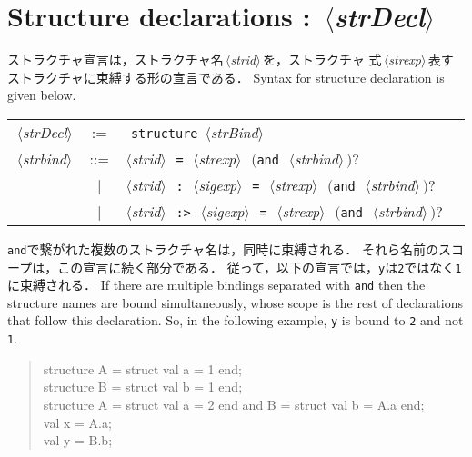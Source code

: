 \documentclass{jbook}
\newcommand{\txt}[2]{#2}
\newcommand{\code}[1]{\mbox{\large\tt #1}}
\newcommand{\vbar}{\mbox{\ $|$\ }}
\newcommand{\nonterm}[1]{\mbox{$\,\langle$}{\it #1}\mbox{$\rangle\,$}}
\newcommand{\term}[1]{\mbox{{\tt #1}}}
\newcommand{\optional}[1]{\mbox{$($}{\protect #1}\mbox{$)?$}}
\newenvironment{program}{\begin{quote}\begin{tt}}%
                        {\end{tt}\end{quote}}
\begin{document}
\section{
\txt{ストラクチャ宣言}{Structure declarations} : \nonterm{strDecl}
}

\ifjp%
	ストラクチャ宣言は，ストラクチャ名\nonterm{strid}を，ストラクチャ
式\nonterm{strexp}表すストラクチャに束縛する形の宣言である． 
\else%
	Syntax for structure declaration is given below.
\fi%

\begin{center}
\begin{tabular}{lcll}
\nonterm{strDecl} &:= &\ \term{structure} \nonterm{strBind}\\
\nonterm{strbind}
    &::=  & \nonterm{strid}\ \term{=}\ \nonterm{strexp}\ \optional{\term{and}\ \nonterm{strbind}}\\
    &\vbar& \nonterm{strid}\ \term{:}\ \nonterm{sigexp}\ \term{=}\ \nonterm{strexp}\ \optional{\term{and}\ \nonterm{strbind}}\\
    &\vbar& \nonterm{strid}\ \term{:>}\ \nonterm{sigexp}\ \term{=}\ \nonterm{strexp}\ \optional{\term{and}\ \nonterm{strbind}}
\end{tabular}
\end{center}

\ifjp%
	\term{and}で繋がれた複数のストラクチャ名は，同時に束縛される．
	それら名前のスコープは，この宣言に続く部分である．
	従って，以下の宣言では，\code{y}は\code{2}ではなく\code{1}に束縛される．
\else%
	If there are multiple bindings separated with \code{and} then
the structure names are bound simultaneously, whose scope is the rest of
declarations that follow this declaration.
	So, in the following example, \code{y} is bound to \code{2} and
not \code{1}.
\fi%

\begin{program}
structure A = struct val a = 1 end;
\\
structure B = struct val b = 1 end;
\\
structure A = struct val a = 2 end and B = struct val b = A.a end;
\\
val x = A.a;
\\
val y = B.b;
\end{program}
\end{document}
